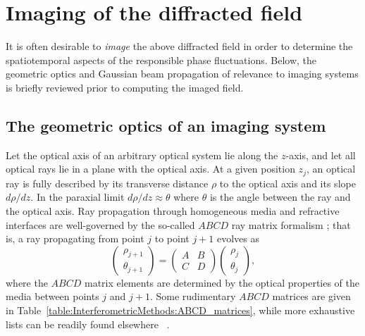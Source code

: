 \section{Imaging of the diffracted field}
\label{sec:InterferometricMethods:imaging}
It is often desirable to \emph{image} the above diffracted field
in order to determine the spatiotemporal aspects
of the responsible phase fluctuations.
Below, the geometric optics and Gaussian beam propagation
of relevance to imaging systems is briefly reviewed
prior to computing the imaged field.


\subsection{The geometric optics of an imaging system}
Let the optical axis of an arbitrary optical system lie along the $z$-axis,
and let all optical rays lie in a plane with the optical axis.
At a given position $z_j$, an optical ray is fully described by
its transverse distance $\rho$ to the optical axis and
its slope $d\rho / dz$.
In the paraxial limit $d\rho / dz \approx \theta$
where $\theta$ is the angle between the ray and the optical axis.
Ray propagation through homogeneous media and refractive interfaces
are well-governed by the so-called $ABCD$ ray matrix formalism
\cite[Ch.~15]{siegman_lasers};
that is, a ray propagating from point $j$ to point $j + 1$ evolves as
\begin{equation}
  \begin{pmatrix}
    \rho_{j + 1}
    \\
    \theta_{j + 1}
  \end{pmatrix}
  =
  \begin{pmatrix}
    A & B
    \\
    C & D
  \end{pmatrix}
  \begin{pmatrix}
    \rho_j
    \\
    \theta_j
  \end{pmatrix},
  \label{eq:InterferometricMethods:ABCD_ray_tracing_general}
\end{equation}
where the $ABCD$ matrix elements are determined
by the optical properties of the media between points $j$ and $j + 1$.
Some rudimentary $ABCD$ matrices are given in
Table~\ref{table:InterferometricMethods:ABCD_matrices}, while
more exhaustive lists can be readily found elsewhere
\cite[Ch.~15]{siegman_lasers}~\cite{tovar_generalized_beam_matrices_IV}.


